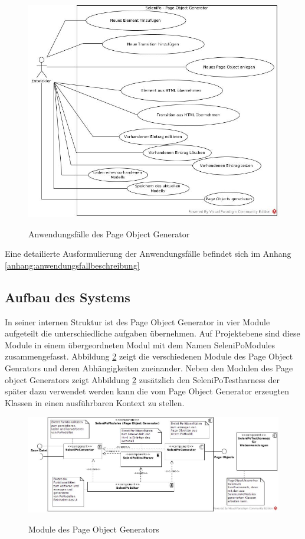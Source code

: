 \begin{figure}[htb]
  \centering  
  \includegraphics[scale=0.45]{img/Use-Cases.jpg}\\
  \caption{Anwendungsfälle des Page Object Generator}
  \label{fig:use_case}
\end{figure}

Eine detailierte Ausformulierung der Anwendungsfälle befindet sich im Anhang \ref{anhang:anwendungsfallbeschreibung}

\newpage

\subsection{Aufbau des Systems}
In seiner internen Struktur ist des Page Object Generator in vier Module aufgeteilt die unterschiedliche aufgaben übernehmen. Auf Projektebene sind diese Module in einem übergeordneten Modul mit dem Namen SeleniPoModules zusammengefasst. Abbildung \ref{fig:component_diagramm} zeigt die verschiedenen Module des Page Object Genrators und deren Abhängigkeiten zueinander.
Neben den Modulen des Page object Generators zeigt Abbildung \ref{fig:component_diagramm} zusätzlich den SeleniPoTestharness der später dazu verwendet werden kann die vom Page Object Generator erzeugten Klassen in einen ausführbaren Kontext zu stellen.

\begin{figure}[htb]
  \centering  
  \includegraphics[scale=0.46]{img/ComponentDiagram.jpg}\\
  \caption{Module des Page Object Generators}
  \label{fig:component_diagramm}
\end{figure}

